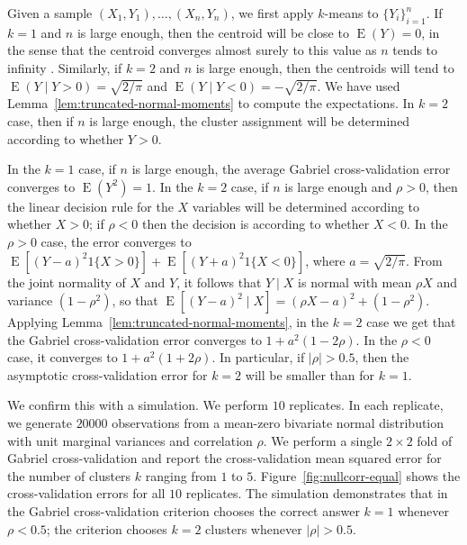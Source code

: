 \documentclass[11pt]{article}
\newcommand{\E}{\operatorname{E}}
\begin{document}
Given a sample $(X_1, Y_1), \dotsc, (X_n, Y_n)$, we first apply $k$-means to
$\{ Y_i \}_{i=1}^{n}$.  If $k = 1$ and $n$ is large enough, then the centroid
will be close to $\E(Y) = 0$, in the sense that the centroid converges almost
surely to this value as $n$ tends to infinity \citep{pollard1981strong}.
Similarly, if $k = 2$ and $n$ is large enough, then the centroids will tend to
$\E(Y \mid Y > 0) = \sqrt{2/\pi}$ and $\E(Y \mid Y < 0) = -\sqrt{2/\pi}$.  We
have used Lemma~\ref{lem:truncated-normal-moments} to compute the
expectations.  In $k = 2$ case, then if $n$ is large enough, the cluster
assignment will be determined according to whether $Y > 0$.

In the $k = 1$ case, if $n$ is large enough, the average Gabriel
cross-validation error converges to $\E(Y^2) = 1$. In the $k = 2$ case, if $n$
is large enough and $\rho > 0$, then the linear decision rule for the $X$
variables will be determined according to whether $X > 0$; if $\rho < 0$ then
the decision is according to whether $X < 0$.  In the $\rho > 0$ case, the
error converges to $\E[(Y - a)^2 1\{ X > 0\}] + \E[(Y + a)^2 1\{X < 0\}]$,
where $a = \sqrt{2/\pi}$.  From the joint normality of $X$ and $Y$, it follows
that $Y \mid X$ is normal with mean $\rho X$ and variance $(1 - \rho^2)$, so
that $\E[(Y - a)^2 \mid X] = (\rho X - a)^2 + (1 - \rho^2)$.  Applying
Lemma~\ref{lem:truncated-normal-moments}, in the $k = 2$ case we get that the
Gabriel cross-validation error converges to $1 + a^2 (1 - 2 \rho)$.  In the
$\rho < 0$ case, it converges to $1 + a^2 (1 + 2 \rho)$.  In
particular, if $|\rho| > 0.5$, then the asymptotic cross-validation error for $k
= 2$ will be smaller than for $k = 1$.

We confirm this with a simulation.  We perform $10$ replicates.  In each
replicate, we generate $20000$ observations from a mean-zero bivariate normal
distribution with unit marginal variances and correlation $\rho$.  We perform
a single $2 \times 2$ fold of Gabriel cross-validation and report the
cross-validation mean squared error for the number of clusters $k$ ranging
from $1$ to $5$.  Figure~\ref{fig:nullcorr-equal} shows the
cross-validation errors for all $10$ replicates.  The simulation demonstrates
that in the Gabriel cross-validation criterion chooses the correct answer $k =
1$ whenever $\rho < 0.5$; the criterion chooses $k = 2$ clusters whenever
$|\rho| > 0.5$.
\end{document}
